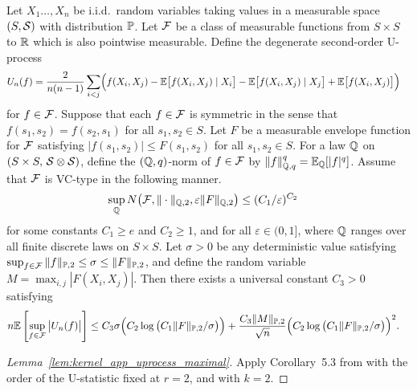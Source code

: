 \begin{lemma}
  \label{lem:kernel_app_uprocess_maximal}

  Let $X_1 \ldots, X_n$
  be i.i.d.\ random variables taking values
  in a measurable space $(S, \cS)$
  with distribution $\P$.
  Let $\cF$ be a class of measurable functions from
  $S \times S$ to $\R$ which is also pointwise measurable.
  Define the degenerate second-order U-process
  \begin{align*}
    U_n(f)
    =
    \frac{2}{n(n-1)}
    \sum_{i<j}
    &\Big(
      f(X_i, X_j)
      - \E\big[f(X_i,X_j) \mid X_i\big]
      -
      \E\big[f(X_i,X_j) \mid X_j\big]
      + \E\big[f(X_i,X_j)\big]
    \Big)
  \end{align*}
  for $f \in \cF$.
  Suppose that each $f \in \cF$ is symmetric in the sense that
  $f(s_1,s_2) = f(s_2,s_1)$
  for all $s_1, s_2 \in S$.
  Let $F$ be a measurable envelope function for $\cF$
  satisfying $|f(s_1,s_2)| \leq F(s_1,s_2)$
  for all $s_1,s_2 \in S$.
  For a law $\Q$ on
  $(S \times S, \, \cS \otimes \cS)$,
  define the $(\Q,q)$-norm of $f \in \cF$ by
  $\|f\|_{\Q,q}^q = \E_\Q[|f|^q]$.
  Assume that $\cF$ is VC-type in the following manner.
  \begin{align*}
    \sup_\Q
    N\big(
      \cF, \|\cdot\|_{\Q,2}, \varepsilon \|F\|_{\Q,2}
    \big)
    &\leq
    (C_1/\varepsilon)^{C_2}
  \end{align*}
  for some constants
  $C_1 \geq e$
  and
  $C_2 \geq 1$,
  and for all $\varepsilon \in (0,1]$,
  where $\Q$ ranges over all finite discrete laws
  on
  $S \times S$.
  Let $\sigma > 0$ be any deterministic value satisfying
  $\sup_{f \in \cF} \|f\|_{\P,2} \leq \sigma \leq \|F\|_{\P,2}$,
  and define the random variable $M = \max_{i,j} |F(X_i, X_j)|$.
  Then there exists a universal constant $C_3 > 0$
  satisfying
  \begin{align*}
    n
    \E\left[
      \sup_{f \in \cF}
      \big| U_n(f) \big|
    \right]
    &\leq
    C_3 \sigma
    \Big(
      C_2 \log\big(C_1 \|F\|_{\P,2} / \sigma \big)
    \Big)
    + \frac{C_3 \|M\|_{\P,2}}{\sqrt{n}}
    \Big(
      C_2 \log\big(C_1 \|F\|_{\P,2} / \sigma \big)
    \Big)^2.
  \end{align*}

\end{lemma}

\begin{proof}[Lemma~\ref{lem:kernel_app_uprocess_maximal}]

  Apply Corollary~5.3
  from \citet{chen2020jackknife}
  with the order of the U-statistic fixed at
  $r=2$,
  and with $k=2$.
\end{proof}

